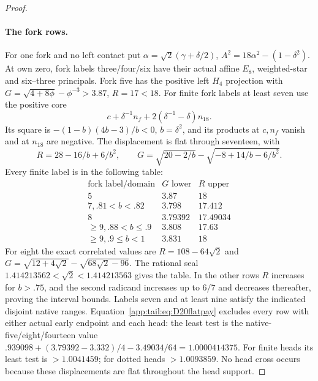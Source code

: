 \documentclass[11pt]{article}
\theoremstyle{definition}
\theoremstyle{remark}
\begin{document}
\begin{proof}
\paragraph{The fork rows.}
For one fork and no left contact put
$\alpha=\sqrt2(\gamma+\delta/2)$,
$A^2=18\alpha^2-(1-\delta^2)$.
At own zero, fork labels three/four/six have their actual affine
$E_8$, weighted-star and six--three principals.
Fork five has the positive left $H_4$ projection with
$G=\sqrt{4+8\phi}-\phi^{-3}>3.87$, $R=17<18$.
For finite fork labels at least seven use the positive core
\[
 c+\delta^{-1}n_f+2(\delta^{-1}-\delta)n_{18}.
\]
Its square is $-(1-b)(4b-3)/b<0$, $b=\delta^2$,
and its products at $c,n_f$ vanish and at $n_{18}$ are
negative. The displacement is flat through seventeen, with
\[
 R=28-16/b+6/b^2,\qquad
 G=\sqrt{20-2/b}-\sqrt{-8+14/b-6/b^2}.
\]
Every finite label is in the following table:
\[
\begin{array}{c|cc}
\text{fork label/domain}&G\text{ lower}&R\text{ upper}\\\hline
5&3.87&18\\
7, .81<b<.82&3.798&17.412\\
8&3.79392&17.49034\\
\ge9, .88<b\le.9&3.808&17.63\\
\ge9, .9\le b<1&3.831&18
\end{array}
\]
For eight the exact correlated values are
$R=108-64\sqrt2$ and
$G=\sqrt{12+4\sqrt2}-\sqrt{68\sqrt2-96}$.
The rational seal $1.414213562<\sqrt2<1.414213563$
gives the table. In the other rows $R$ increases for $b>.75$,
and the second radicand increases up to $6/7$ and decreases
thereafter, proving the interval bounds. Labels seven and at
least nine satisfy the indicated disjoint native ranges.
Equation~\eqref{app:tail:eq:D20flatpay} excludes every row
with either actual early endpoint and each head: the least
test is the native-five/eight/fourteen value
$.939098+(3.79392-3.332)/4-3.49034/64=1.0000414375$.
For finite heads its least test is $>1.0041459$; for dotted
heads $>1.0093859$. No head cross occurs because these
displacements are flat throughout the head support.


\end{proof}
\end{document}
